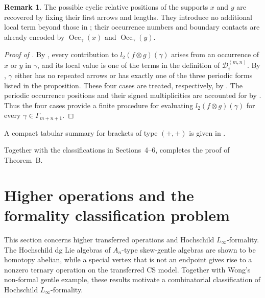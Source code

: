 \documentclass[11pt,a4paper,reqno]{amsart}
\newcommand{\mD}{\mathcal D}
\newcommand{\Occ}{\operatorname{Occ}}
\theoremstyle{plain}
\theoremstyle{definition}
\newtheorem{remark}[remark]{Remark}
\numberwithin{equation}{section}
\begin{document}
	\begin{remark}
		The possible cyclic relative positions of the supports $x$ and $y$ are
		recovered by fixing their first arrows and lengths.  They introduce no
		additional local term beyond those in ; their
		occurrence numbers and boundary contacts are already encoded by $\Occ_\gamma(x)$ and $\Occ_\gamma(y)$.
	\end{remark}
	
	
	\begin{proof}[Proof of ]
		By , every contribution to $l_2(f\otimes g)(\gamma)$ arises
		from an occurrence of $x$ or $y$ in $\gamma$, and its local value is one of
		the terms in the definition of $\mD_i^{(m,n)}$.  By ,
		$\gamma$ either has no repeated arrows or has exactly one of the three
		periodic forms listed in the proposition.  These four cases are treated,
		respectively, by
		.
		The periodic occurrence positions and their signed multiplicities are
		accounted for by
		.  Thus the
		four cases provide a finite procedure for evaluating
		$l_2(f\otimes g)(\gamma)$ for every $\gamma\in\Gamma_{m+n+1}$.
	\end{proof}
	
	A compact tabular summary for brackets of type $(+,+)$ is given in
	.
	
	Together with the classifications in Sections~4--6,
	 completes the proof of
	Theorem~B.
	
	\section{Higher operations and the formality classification problem}
	\label{sec:higher-operations-formality}
	
	This section concerns higher transferred operations and Hochschild
	$L_\infty$-formality. The Hochschild dg Lie algebras of $A_n$-type
	skew-gentle algebras are shown to be homotopy abelian, while a
	special vertex that is not an endpoint gives rise to a nonzero
	ternary operation on the transferred CS model. Together with
	Wong's non-formal gentle example, these results motivate a
	combinatorial classification of Hochschild $L_\infty$-formality.
	
\end{document}
